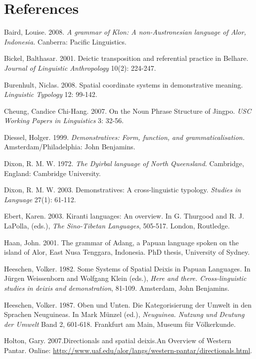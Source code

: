 \section[References]{References}
Baird, Louise. 2008. \textit{A grammar of Klon: A non-Austronesian language of Alor, Indonesia. }Canberra: Pacific Linguistics.

Bickel, Balthasar. 2001. Deictic transposition and referential practice in Belhare. \textit{Journal of Linguistic Anthropology }10(2): 224-247.

Burenhult, Niclas. 2008. Spatial coordinate systems in demonstrative meaning. \textit{Linguistic Typology} 12: 99-142.

Cheung, Candice Chi-Hang. 2007. On the Noun Phrase Structure of Jingpo. \textit{USC Working Papers in Linguistics} 3: 32-56. 

Diessel, Holger. 1999. \textit{Demonstratives: Form, function, and grammaticalisation.} Amsterdam/Philadelphia: John Benjamins.

Dixon, R. M. W. 1972. \textit{The Dyirbal language of North Queensland}. Cambridge, England: Cambridge University.

Dixon, R. M. W. 2003. Demonstratives: A cross-linguistic typology. \textit{Studies in Language }27(1): 61-112. 

Ebert, Karen. 2003. Kiranti languages: An overview. In G. Thurgood and R. J. LaPolla, (eds.), \textit{The Sino-Tibetan Languages}, 505-517. London, Routledge.

Haan, John. 2001. The grammar of Adang, a Papuan language spoken on the island of Alor, East Nusa Tenggara, Indonesia. PhD thesis, University of Sydney.

Heeschen, Volker. 1982. Some Systems of Spatial Deixis in Papuan Languages. In J\"urgen Weissenborn and Wolfgang Klein (eds.), \textit{Here and there. Cross-linguistic studies in deixis and demonstration}, 81-109. Amsterdam, John Benjamins.

Heeschen, Volker. 1987. Oben und Unten. Die Kategorisierung der Umwelt in den Sprachen Neuguineas. In Mark M\"unzel (ed.), \textit{Neuguinea. Nutzung und Deutung der Umwelt} Band 2, 601-618. Frankfurt am Main, Museum f\"ur V\"olkerkunde. 

Holton, Gary. 2007.\textstyleappleconvertedspace{~}Directionals and spatial deixis.\textstyleappleconvertedspace{~}An Overview of Western Pantar.\newline
Online: \url{http://www.uaf.edu/alor/langs/western-pantar/directionals.html}.

